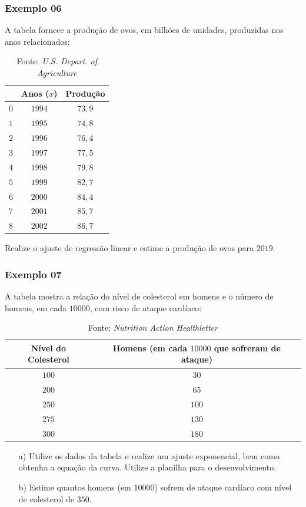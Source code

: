 \documentclass[hyperref={pdfpagelabels=false}]{beamer}
\begin{document}
\begin{frame}
\frametitle{Exemplo 06}

A tabela fornece a produção de ovos, em bilhões de unidades, produzidas nos anos relacionados:

\begin{table}[h]
	\centering
	\begin{tabular}{|c|c|c|}
		\hline
			&	Anos ($x$)	&	Produção	\\
		\hline
		$0$	&	$1994$		&	$73,9$	\\
		\hline
		$1$	&	$1995$		&	$74,8$	\\
		\hline
		$2$	&	$1996$		&	$76,4$	\\
		\hline
		$3$	&	$1997$		&	$77,5$	\\
		\hline
		$4$	&	$1998$		&	$79,8$	\\
		\hline
		$5$	&	$1999$		&	$82,7$	\\
		\hline
		$6$	&	$2000$		&	$84,4$	\\
		\hline
		$7$	&	$2001$		&	$85,7$	\\
		\hline
		$8$	&	$2002$		&	$86,7$	\\
		\hline
	\end{tabular}
	\caption{Fonte: {\it U.S. Depart. of Agriculture}}
\end{table}
Realize o ajuste de regressão linear e estime a produção de ovos para $2019$.
\end{frame}

\begin{frame}
\frametitle{Exemplo 07}

A tabela mostra a relação do nível de colesterol em homens e o número de homens, em cada $10000$, com risco de ataque cardíaco:

\begin{table}[h]
	\centering
	\begin{tabular}{|c|c|}
		\hline
		Nível do Colesterol		&	Homens (em cada $10000$ que sofreram de ataque) \\
		\hline
		$100$	&	$30$	\\
		\hline
		$200$	&	$65$	\\
		\hline
		$250$	&	$100$	\\
		\hline
		$275$	&	$130$	\\
		\hline
		$300$	&	$180$	\\
		\hline
	\end{tabular}
	\caption{Fonte: {\it Nutrition Action Healthletter}}
\end{table}
\begin{enumerate}
	\item [a)] Utilize os dados da tabela e realize um ajuste exponencial, bem como obtenha a equação da curva. Utilize a planilha para o desenvolvimento.
	\item [b)] Estime quantos homens (em $10000$) sofrem de ataque cardíaco com nível de colesterol de $350$.
\end{enumerate}
\end{frame}
\end{document}
